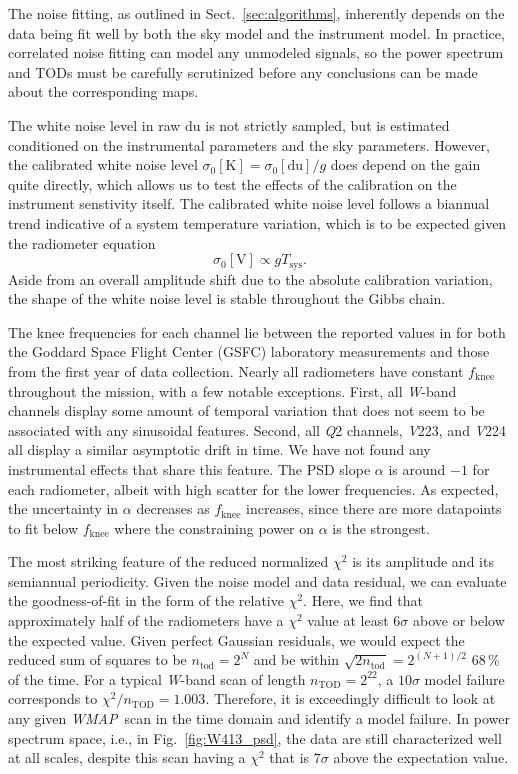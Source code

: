 \documentclass[twocolumn]{../../common/aa}
\def\WMAP{\emph{WMAP}}
\newcommand{\Q}[0]{\textit Q}
\newcommand{\V}[0]{\textit V}
\newcommand{\W}[0]{\textit W}
\begin{document}
The noise fitting, as outlined in Sect.~\ref{sec:algorithms}, inherently depends on the data being fit well by both the sky model and the instrument model. In practice, correlated noise fitting can model any unmodeled signals, so the power spectrum and TODs must be carefully scrutinized before any conclusions can be made about the corresponding maps.

The white noise level in raw du is not strictly sampled, but is estimated conditioned on the instrumental parameters and the sky parameters. However, the calibrated white noise level $\sigma_0[\mathrm K]=\sigma_0[\mathrm{du}]/g$ does depend on the gain quite directly, which allows us to test the effects of the calibration on the instrument senstivity itself. The calibrated white noise level follows a biannual trend indicative of a system temperature variation, which is to be expected given the radiometer equation
\begin{equation}
	\sigma_0[\mathrm V]\propto gT_\mathrm{sys}.
\end{equation}
Aside from an overall amplitude shift due to the absolute calibration variation, the shape of the white noise level is stable throughout the Gibbs chain.

The knee frequencies for each channel lie between the reported values in \citet{jarosik2003a} for both the Goddard Space Flight Center (GSFC) laboratory measurements and those from the first year of data collection. Nearly all radiometers have constant $f_\mathrm{knee}$ throughout the mission, with a few notable exceptions. First, all \W-band channels display some amount of temporal variation that does not seem to be associated with any sinusoidal features. Second, all \Q2 channels, \V223, and \V224 all display a similar asymptotic drift in time. We have not found any instrumental effects that share this feature.
The PSD slope $\alpha$ is around $-1$ for each radiometer, albeit with high scatter for the lower frequencies. As expected, the uncertainty in $\alpha$ decreases as $f_\mathrm{knee}$ increases, since there are more datapoints to fit below $f_\mathrm{knee}$ where the constraining power on $\alpha$ is the strongest.


The most striking feature of the reduced normalized $\chi^2$ is its amplitude
and its semiannual periodicity.  Given the noise model and data residual, we
can evaluate the goodness-of-fit in the form of the relative $\chi^2$. Here, we
find that approximately half of the radiometers have a $\chi^2$ value at least
$6\sigma$ above or below the expected value.  Given perfect Gaussian residuals,
we would expect the reduced sum of squares to be $n_\mathrm{tod}=2^N$ and be
within $\sqrt{2n_\mathrm{tod}}=2^{(N+1)/2}$ 68\,\% of the time. For a typical
\W-band scan of length $n_\mathrm{TOD}=2^{22}$, a $10\sigma$ model failure
corresponds to $\chi^2/n_\mathrm{TOD}=1.003$. Therefore, it is exceedingly
difficult to look at any given \WMAP\ scan in the time domain and identify a
model failure. In power spectrum space, i.e., in Fig.~\ref{fig:W413_psd}, the
data are still characterized well at all scales, despite this scan having a
$\chi^2$ that is $7\sigma$ above the expectation value. 
\end{document}
